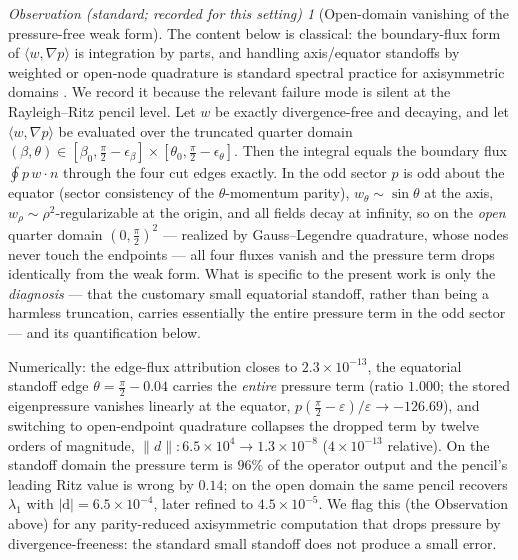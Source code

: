 \documentclass[11pt]{article}
\theoremstyle{plain}
\theoremstyle{remark}
\newtheorem*{observation}{Observation (standard; recorded for this setting)}
\begin{document}
\begin{observation}[Open-domain vanishing of the pressure-free weak
form]
\label{lem:opendomain}
The content below is classical: the boundary-flux form of
$\langle w,\nabla p\rangle$ is integration by parts, and handling
axis/equator standoffs by weighted or open-node quadrature is standard
spectral practice for axisymmetric domains \cite{BDM99}. We record it
because the relevant failure mode is silent at the Rayleigh--Ritz
pencil level. Let $w$ be exactly divergence-free and decaying, and let
$\langle w, \nabla p\rangle$ be evaluated over the truncated quarter
domain $(\beta,\theta) \in [\beta_0, \tfrac\pi2 - \epsilon_\beta]
\times [\theta_0, \tfrac\pi2 - \epsilon_\theta]$. Then the integral
equals the boundary flux $\oint p\, w\!\cdot\!n$ through the four cut
edges exactly. In the odd sector $p$ is odd about the equator (sector
consistency of the $\theta$-momentum parity), $w_\theta \sim \sin\theta$
at the axis, $w_\rho \sim \rho^2$-regularizable at the origin, and all
fields decay at infinity, so on the \emph{open} quarter domain
$(0,\tfrac\pi2)^2$ --- realized by Gauss--Legendre quadrature, whose
nodes never touch the endpoints --- all four fluxes vanish and the
pressure term drops identically from the weak form. What is specific to
the present work is only the \emph{diagnosis} --- that the customary
small equatorial standoff, rather than being a harmless truncation,
carries essentially the entire pressure term in the odd sector --- and
its quantification below.
\end{observation}

Numerically: the edge-flux attribution closes to $2.3\times 10^{-13}$,
the equatorial standoff edge $\theta = \tfrac\pi2 - 0.04$ carries the
\emph{entire} pressure term (ratio $1.000$; the stored eigenpressure
vanishes linearly at the equator, $p(\tfrac\pi2{-}\varepsilon)/
\varepsilon \to -126.69$), and switching to open-endpoint quadrature
collapses the dropped term by twelve orders of magnitude,
$\|d\| : 6.5\times 10^{4} \to 1.3\times 10^{-8}$
($4\times 10^{-13}$ relative). On the standoff domain the pressure
term is $96\%$ of the operator output and the pencil's leading Ritz
value is wrong by $0.14$; on the open domain the same pencil recovers
$\lambda_1$ with $|\mathrm{d}| = 6.5\times 10^{-4}$, later refined to
$4.5\times 10^{-5}$. We flag this (the Observation above) for any
parity-reduced axisymmetric computation that drops pressure by
divergence-freeness: the standard small standoff does not produce a
small error.
\end{document}
